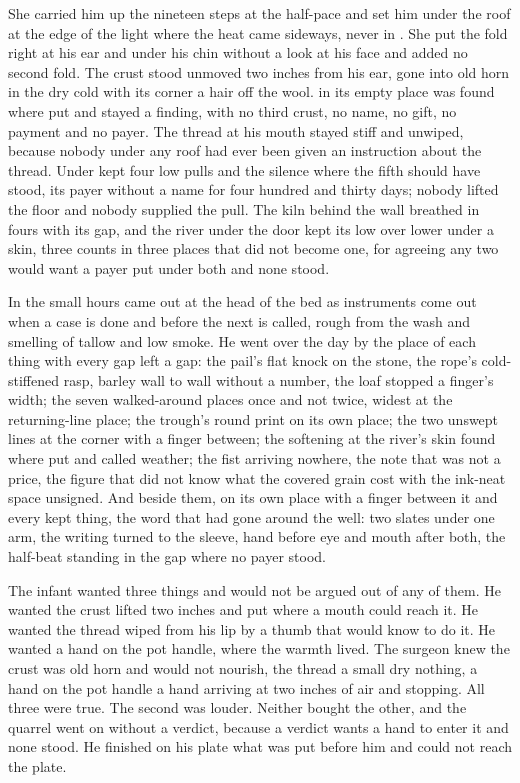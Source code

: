 She carried him up the nineteen steps at the half-pace and set him under the roof at the edge of the light where the heat came sideways, never in . She put the fold right at his ear and under his chin without a look at his face and added no second fold. The crust stood unmoved two inches from his ear, gone into old horn in the dry cold with its corner a hair off the wool.  in its empty place was found where put and stayed a finding, with no third crust, no name, no gift, no payment and no payer. The thread at his mouth stayed stiff and unwiped, because nobody under any roof had ever been given an instruction about the thread. Under   kept four low pulls and the silence where the fifth should have stood, its payer without a name for four hundred and thirty days; nobody lifted the floor and nobody supplied the pull. The kiln behind the wall breathed in fours with its gap, and the river under the door kept its low over lower under a skin, three counts in three places that did not become one, for agreeing any two would want a payer put under both and none stood.

In the small hours  came out at the head of the bed as instruments come out when a case is done and before the next is called, rough from the wash and smelling of tallow and low smoke. He went over the day by the place of each thing with every gap left a gap: the pail's flat knock on the stone, the rope's cold-stiffened rasp, barley wall to wall without a number, the loaf stopped a finger's width; the seven walked-around places once and not twice, widest at the returning-line place; the trough's round print on its own place; the two unswept lines at the corner with a finger between; the softening at the river's skin found where put and called weather; the fist arriving nowhere, the note that was not a price, the figure that did not know what the covered grain cost with the ink-neat space unsigned. And beside them, on its own place with a finger between it and every kept thing, the word that had gone around the well: two slates under one arm, the writing turned to the sleeve, hand before eye and mouth after both, the half-beat standing in the gap where no payer stood.

The infant wanted three things and would not be argued out of any of them. He wanted the crust lifted two inches and put where a mouth could reach it. He wanted the thread wiped from his lip by a thumb that would know to do it. He wanted a hand on the pot handle, where the warmth lived. The surgeon knew the crust was old horn and would not nourish, the thread a small dry nothing, a hand on the pot handle a hand arriving at two inches of air and stopping. All three were true. The second was louder. Neither bought the other, and the quarrel went on without a verdict, because a verdict wants a hand to enter it and none stood. He finished on his plate what was put before him and could not reach the plate.


